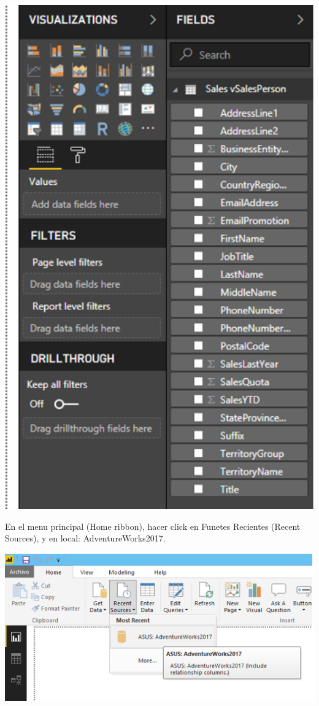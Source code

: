 \documentclass[12pt,letterpaper]{article}
\begin{document}
\begin{center}
    \includegraphics[width=16cm]{img/8.png}  
\end{center}
En el menu principal (Home ribbon), hacer click en Funetes Recientes (Recent Sources), y en local:
AdventureWorks2017.
\begin{center}
    \includegraphics[width=16cm]{img/9.png}  
\end{center}
\end{document}
